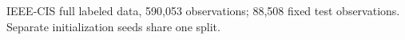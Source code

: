 IEEE-CIS full labeled data, 590,053 observations; 88,508 fixed test observations. Separate initialization seeds share one split.